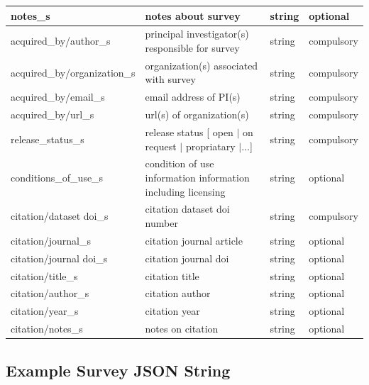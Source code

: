 \documentclass{article}
\begin{document}
\begin{table}[htb!]
\begin{tabular}{|l|l|l|l|}
		notes\_s & notes about survey & string & optional \\ \hline
		acquired\_by/author\_s & principal investigator(s) responsible for survey & string & compulsory \\ \hline
		acquired\_by/organization\_s & organization(s) associated with survey & string & compulsory \\ \hline
		acquired\_by/email\_s & email address of PI(s) & string & compulsory \\ \hline
		acquired\_by/url\_s & url(s) of organization(s) & string & compulsory \\ \hline
		release\_status\_s & release status [ open $|$ on request $|$ propriatary $|$...] & string & compulsory \\ \hline
		conditions\_of\_use\_s & condition of use information information including licensing & string & optional \\ \hline
		citation/dataset doi\_s & citation dataset doi number & string & compulsory \\ \hline
		citation/journal\_s & citation journal article & string & optional \\ \hline
		citation/journal doi\_s & citation journal doi & string & optional \\ \hline
		citation/title\_s & citation title & string & optional \\ \hline
		citation/author\_s & citation author & string & optional \\ \hline
		citation/year\_s & citation year & string & optional \\ \hline
		citation/notes\_s & notes on citation & string & optional \\ \hline
	\end{tabular}
	\label{tab:survey}
\end{table} 

\newpage
\subsection{Example Survey JSON String}
\end{document}

